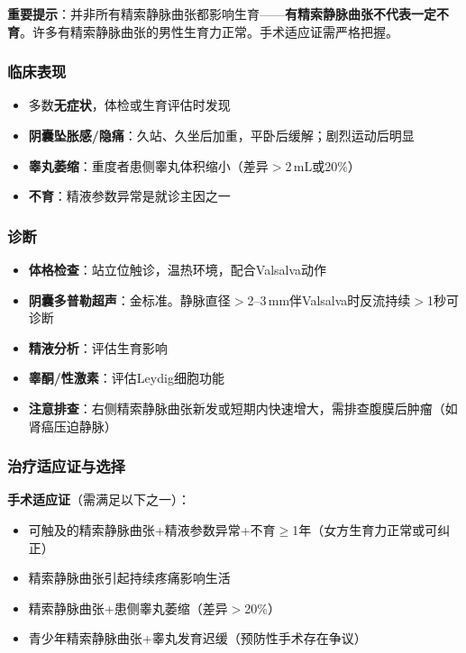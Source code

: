 \textbf{重要提示}：并非所有精索静脉曲张都影响生育——\textbf{有精索静脉曲张不代表一定不育}。许多有精索静脉曲张的男性生育力正常。手术适应证需严格把握。

\subsubsection{临床表现}

\begin{itemize}[leftmargin=2cm]
	\item 多数\textbf{无症状}，体检或生育评估时发现
	\item \textbf{阴囊坠胀感/隐痛}：久站、久坐后加重，平卧后缓解；剧烈运动后明显
	\item \textbf{睾丸萎缩}：重度者患侧睾丸体积缩小（差异$>$2\,mL或20\%）
	\item \textbf{不育}：精液参数异常是就诊主因之一
\end{itemize}

\subsubsection{诊断}

\begin{itemize}[leftmargin=2cm]
	\item \textbf{体格检查}：站立位触诊，温热环境，配合Valsalva动作
	\item \textbf{阴囊多普勒超声}：金标准。静脉直径$>$2--3\,mm伴Valsalva时反流持续$>$1秒可诊断
	\item \textbf{精液分析}：评估生育影响
	\item \textbf{睾酮/性激素}：评估Leydig细胞功能
	\item \textbf{注意排查}：右侧精索静脉曲张新发或短期内快速增大，需排查腹膜后肿瘤（如肾癌压迫静脉）
\end{itemize}

\subsubsection{治疗适应证与选择}

\textbf{手术适应证}（需满足以下之一）：
\begin{itemize}[leftmargin=2cm]
	\item 可触及的精索静脉曲张+精液参数异常+不育$\ge$1年（女方生育力正常或可纠正）
	\item 精索静脉曲张引起持续疼痛影响生活
	\item 精索静脉曲张+患侧睾丸萎缩（差异$>$20\%）
	\item 青少年精索静脉曲张+睾丸发育迟缓（预防性手术存在争议）
\end{itemize}

